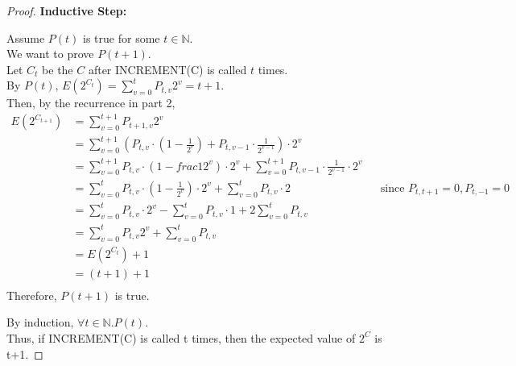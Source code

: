 \documentclass[10pt]{article}
\begin{document}
\begin{enumerate}
\begin{proof}
			\textbf{Inductive Step:}
			\begin{addmargin}[1em]{0em}
				Assume $P(t)$ is true for some $t \in \mathbb{N}$. \\
				We want to prove $P(t+1)$. \\
				Let $C_t$ be the $C$ after INCREMENT(C) is called $t$ times. \\
				By $P(t)$, $E(2^{C_t}) = \sum_{v=0}^{t}P_{t, v}2^v = t+1$. \\
				Then, by the recurrence in part 2,
				\begin{align*}
					E(2^{C_{t+1}})
					& = \sum_{v=0}^{t+1}P_{t+1,v}2^v \\
					& = \sum_{v=0}^{t+1}(P_{t,v} \cdot \left(1- \frac{1}{2^v}
					\right) + P_{t, v-1} \cdot \frac{1}{2^{v-1}}) \cdot 2^v \\
					&= \sum_{v=0}^{t+1}P_{t,v} \cdot \left(1- frac{1}{2^v}
					\right) \cdot 2^v + \sum_{v=0}^{t+1}P_{t,v-1} \cdot
					\frac{1}{2^{v-1}} \cdot 2^v \\
					&= \sum_{v=0}^{t}P_{t,v} \cdot \left(1 - \frac{1}{2^v}
					\right) \cdot 2^v + \sum_{v=0}^{t}P_{t, v} \cdot 2 &&
					\text{since } P_{t, t+1}=0, P_{t, -1}=0 \\
					&= \sum_{v=0}^{t}P_{t,v} \cdot 2^v - \sum_{v=0}^{t}P_{t,v}
					\cdot 1 + 2 \sum_{v=0}^{t}P_{t, v} \\
					&= \sum_{v=0}^{t}P_{t,v}2^v + \sum_{v=0}^{t}P_{t,v} \\
					&= E(2^{C_t}) + 1 \\
					&= (t+1) + 1\\
				\end{align*}
				Therefore, $P(t+1)$ is true.
			\end{addmargin}

			By induction, $\forall t \in \mathbb{N}. P(t)$. \\
			Thus, if INCREMENT(C) is called t times, then the expected value of
			$2^C$ is t+1. 
		\end{proof}

\end{enumerate}
\end{document}
